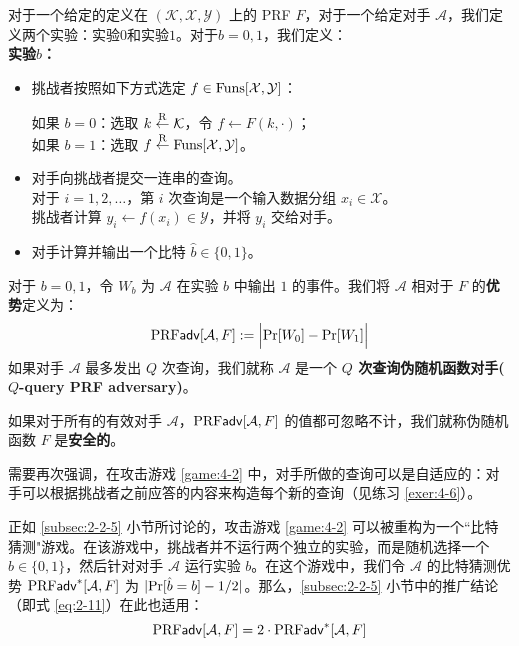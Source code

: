 \begin{game}[伪随机函数]\label{game:4-2}
对于一个给定的定义在 $(\mathcal{K},\mathcal{X},\mathcal{Y})$ 上的 PRF $F$，对于一个给定对手 $\mathcal{A}$，我们定义两个实验：实验$0$和实验$1$。对于$b=0,1$，我们定义：\\
\noindent\textbf{实验$b$：}
\begin{itemize}
	\item 挑战者按照如下方式选定 $f\in{\rm Funs}[\mathcal{X},\mathcal{Y}]$：
	\vspace{1pt}
	
	\hspace*{5pt} 如果 $b=0$：选取 $k\overset{\rm R}\leftarrow\mathcal{K}$，令 $f\leftarrow F(k,\cdot)$；\\
	\hspace*{5pt} 如果 $b=1$：选取 $f\overset{\rm R}\leftarrow{\rm Funs}[\mathcal{X},\mathcal{Y}]$。
	\item 对手向挑战者提交一连串的查询。\\
	对于 $i=1,2,\dots$，第 $i$ 次查询是一个输入数据分组 $x_i\in\mathcal{X}$。\\
	挑战者计算 $y_i\leftarrow f(x_i)\in\mathcal{Y}$，并将 $y_i$ 交给对手。
	\item 对手计算并输出一个比特 $\hat{b}\in\{0,1\}$。
\end{itemize}
对于 $b=0,1$，令 $W_b$ 为 $\mathcal{A}$ 在实验 $b$ 中输出 $1$ 的事件。我们将 $\mathcal{A}$ 相对于 $F$ 的\textbf{优势}定义为：
\begin{equation}\label{eq:4-21}
{\rm PRF\mathsf{adv}}[\mathcal{A}, F]:=
\Big\lvert
{\rm Pr}[W_0]-{\rm Pr}[W_1]
\Big\rvert
\end{equation}
如果对手 $\mathcal{A}$ 最多发出 $Q$ 次查询，我们就称 $\mathcal{A}$ 是一个 \textbf{$Q$ 次查询伪随机函数对手($Q$-query PRF adversary)}。
\end{game}

\begin{definition}\label{def:4-2}
如果对于所有的有效对手 $\mathcal{A}$，${\rm PRF\mathsf{adv}}[\mathcal{A},F]$ 的值都可忽略不计，我们就称伪随机函数 $F$ 是\textbf{安全的}。
\end{definition}

需要再次强调，在攻击游戏 \ref{game:4-2} 中，对手所做的查询可以是自适应的：对手可以根据挑战者之前应答的内容来构造每个新的查询（见练习 \ref{exer:4-6}）。

正如 \ref{subsec:2-2-5} 小节所讨论的，攻击游戏 \ref{game:4-2} 可以被重构为一个``比特猜测"游戏。在该游戏中，挑战者并不运行两个独立的实验，而是随机选择一个 $b\in\{0,1\}$，然后针对对手 $\mathcal{A}$ 运行实验 $b$。在这个游戏中，我们令 $\mathcal{A}$ 的比特猜测优势 ${\rm PRF\mathsf{adv}}^*[\mathcal{A}, F]$ 为 $|{\rm Pr}[\hat{b}=b]-{1}/{2}|$。那么，\ref{subsec:2-2-5} 小节中的推广结论（即式 \ref{eq:2-11}）在此也适用：
\begin{equation}
{\rm PRF\mathsf{adv}}[\mathcal{A}, F]=2\cdot {\rm PRF\mathsf{adv}}^*[\mathcal{A}, F]
\end{equation}

